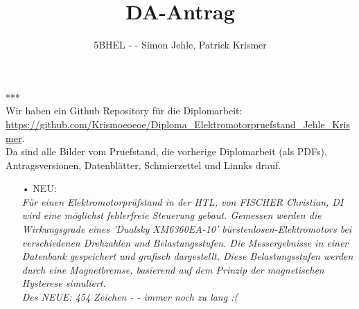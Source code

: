 \documentclass[12pt]{article}
\title{\textbf{\LARGE{DA-Antrag}}}
\author{5BHEL - - Simon Jehle, Patrick Krismer}
\begin{document}
	\maketitle 
***\\
Wir haben ein  Github Repository für die Diplomarbeit:\\
 	\url{https://github.com/Krismoeoeoe/Diploma_Elektromotorpruefstand_Jehle_Krismer}. \\
	Da sind alle Bilder vom Pruefstand, die vorherige Diplomarbeit (als PDFs), Antragsversionen, Datenblätter, Schmierzettel und  Linnks drauf.\\
\begin{itemize}



\begin{figure}
	\centering
	\texttt{[image: Pruefstandplan\_1.png]}\\
	\textit{ Pruefstandplan 1 } konstruiert von Simon Jehle (supertyp)
\end{figure}




\subsection*{Ausgangslage }

\item[•]NEU:\\
\textit{Für einen Elektromotorprüfstand in der HTL, von FISCHER Christian, DI wird eine möglichst fehlerfreie Steuerung gebaut. 
Gemessen werden die Wirkungsgrade eines 'Dualsky XM6360EA-10' bürstenlosen-Elektromotors bei verschiedenen Drehzahlen und Belastungsstufen. 
Die Messergebnisse in einer Datenbank gespeichert und grafisch dargestellt.
Diese Belastungsstufen werden durch eine Magnetbremse, basierend auf dem Prinzip der magnetischen Hysterese simuliert.\\
Des NEUE: 454 Zeichen - - immer noch zu lang :( }\\\\


\end{itemize}
\end{document}
